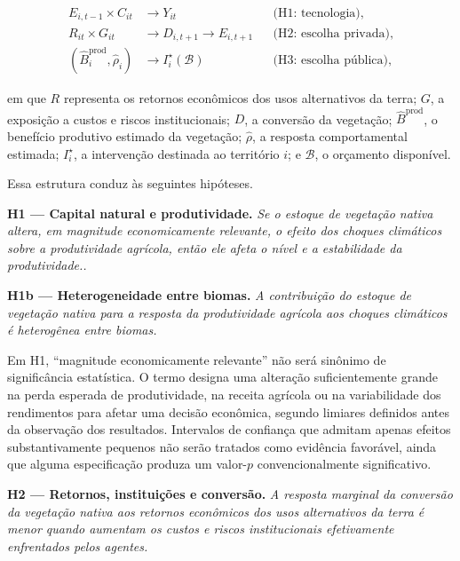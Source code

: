 \begin{equation}
\begin{aligned}
    E_{i,t-1}\times C_{it} &\longrightarrow Y_{it}
        && \text{(H1: tecnologia)}, \\
    R_{it}\times G_{it} &\longrightarrow D_{i,t+1}
        \longrightarrow E_{i,t+1}
        && \text{(H2: escolha privada)}, \\
    \left(\widehat{B}^{\mathrm{prod}}_i,
    \widehat{\rho}_i\right) &\longrightarrow I_i^{\star}(\mathcal{B})
        && \text{(H3: escolha pública)},
\end{aligned}
\label{eq:architecture}
\end{equation}

em que $R$ representa os retornos econômicos dos usos alternativos da terra; $G$, a exposição a custos e riscos institucionais; $D$, a conversão da vegetação; $\widehat{B}^{\mathrm{prod}}$, o benefício produtivo estimado da vegetação; $\widehat{\rho}$, a resposta comportamental estimada; $I_i^{\star}$, a intervenção destinada ao território $i$; e $\mathcal{B}$, o orçamento disponível.

Essa estrutura conduz às seguintes hipóteses.

\medskip
\noindent\textbf{H1 --- Capital natural e produtividade.}
\emph{Se o estoque de vegetação nativa altera, em magnitude economicamente relevante, o efeito dos choques climáticos sobre a produtividade agrícola, então ele afeta o nível e a estabilidade da produtividade..}

\medskip
\noindent\textbf{H1b --- Heterogeneidade entre biomas.}
\emph{A contribuição do estoque de vegetação nativa para a resposta da produtividade agrícola aos choques climáticos é heterogênea entre biomas.}

Em H1, ``magnitude economicamente relevante'' não será sinônimo de significância estatística. O termo designa uma alteração suficientemente grande na perda esperada de produtividade, na receita agrícola ou na variabilidade dos rendimentos para afetar uma decisão econômica, segundo limiares definidos antes da observação dos resultados. Intervalos de confiança que admitam apenas efeitos substantivamente pequenos não serão tratados como evidência favorável, ainda que alguma especificação produza um valor-$p$ convencionalmente significativo.

\medskip
\noindent\textbf{H2 --- Retornos, instituições e conversão.}
\emph{A resposta marginal da conversão da vegetação nativa aos retornos econômicos dos usos alternativos da terra é menor quando aumentam os custos e riscos institucionais efetivamente enfrentados pelos agentes.}

